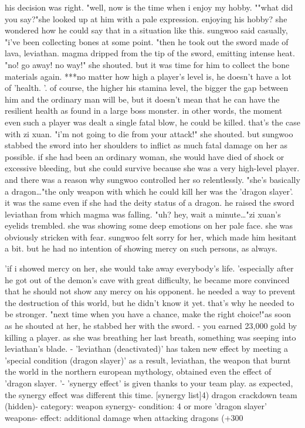  his decision was right.
"well, now is the time when i enjoy my hobby.
""what did you say?"she looked up at him with a pale expression.
 enjoying his hobby? she wondered how he could say that in a situation like this.
sungwoo said casually, "i've been collecting bones at some point.
"then he took out the sword made of lava, leviathan.
 magma dripped from the tip of the sword, emitting intense heat.
"no! go away! no way!" she shouted.
but it was time for him to collect the bone materials again.
***no matter how high a player's level is, he doesn't have a lot of 'health.
'.
of course, the higher his stamina level, the bigger the gap between him and the ordinary man will be, but it doesn't mean that he can have the resilient health as found in a large boss monster.
 in other words, the moment even such a player was dealt a single fatal blow, he could be killed.
 that's the case with zi xuan.
"i'm not going to die from your attack!" she shouted.
but sungwoo stabbed the sword into her shoulders to inflict as much fatal damage on her as possible.
if she had been an ordinary woman, she would have died of shock or excessive bleeding, but she could survive because she was a very high-level player.
and there was a reason why sungwoo controlled her so relentlessly.
"she's basically a dragon…"the only weapon with which he could kill her was the 'dragon slayer'.
 it was the same even if she had the deity status of a dragon.
he raised the sword leviathan from which magma was falling.
"uh? hey, wait a minute…"zi xuan's eyelids trembled.
 she was showing some deep emotions on her pale face.
she was obviously stricken with fear.
sungwoo felt sorry for her, which made him hesitant a bit.
 but he had no intention of showing mercy on such persons, as always.


'if i showed mercy on her, she would take away everybody's life.
'especially after he got out of the demon's cave with great difficulty, he became more convinced that he should not show any mercy on his opponent.
 he needed a way to prevent the destruction of this world, but he didn't know it yet.
 that's why he needed to be stronger.
"next time when you have a chance, make the right choice!"as soon as he shouted at her, he stabbed her with the sword.
- you earned 23,000 gold by killing a player.
as she was breathing her last breath, something was seeping into leviathan's blade.
- 'leviathan (deactivated)' has taken new effect by meeting a 'special condition (dragon slayer)' as a result, leviathan, the weapon that burnt the world in the northern european mythology, obtained even the effect of 'dragon slayer.
'- 'synergy effect' is given thanks to your team play.
as expected, the synergy effect was different this time.
[synergy list]4) dragon crackdown team (hidden)- category: weapon synergy- condition: 4 or more 'dragon slayer' weapons- effect: additional damage when attacking dragons (+300%


 